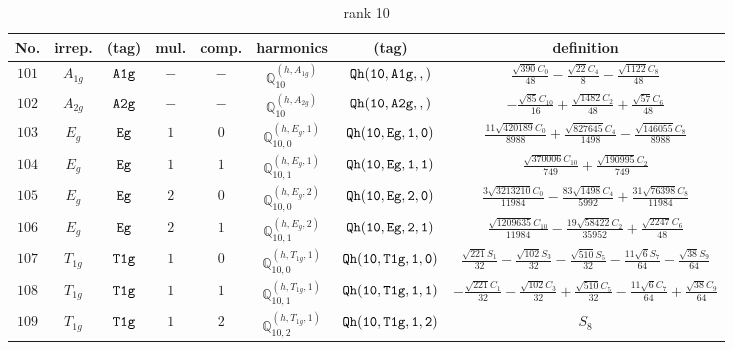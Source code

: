 \documentclass[fleqn,8pt]{jsarticle}
\begin{document}
\begin{table}[ht!]
\begin{center}
\caption{rank 10}
\renewcommand{\arraystretch}{1.3}
\begin{tabular}{cccccccc} \hline \hline
No. & irrep. & (tag) & mul. & comp. & harmonics & (tag) & definition \\ \hline
$ 101 $ & $ A_{1g} $ & $ {\tt A1g} $ & $ - $ & $ - $ & $ \mathbb{Q}_{10}^{(h,A_{1g})} $ & $ {\tt Qh(10,A1g,,)} $ & $ \frac{\sqrt{390} C_{0}}{48} - \frac{\sqrt{22} C_{4}}{8} - \frac{\sqrt{1122} C_{8}}{48} $ \\
$ 102 $ & $ A_{2g} $ & $ {\tt A2g} $ & $ - $ & $ - $ & $ \mathbb{Q}_{10}^{(h,A_{2g})} $ & $ {\tt Qh(10,A2g,,)} $ & $ - \frac{\sqrt{85} C_{10}}{16} + \frac{\sqrt{1482} C_{2}}{48} + \frac{\sqrt{57} C_{6}}{48} $ \\
$ 103 $ & $ E_{g} $ & $ {\tt Eg} $ & $ 1 $ & $ 0 $ & $ \mathbb{Q}_{10,0}^{(h,E_{g},1)} $ & $ {\tt Qh(10,Eg,1,0)} $ & $ \frac{11 \sqrt{420189} C_{0}}{8988} + \frac{\sqrt{827645} C_{4}}{1498} - \frac{\sqrt{146055} C_{8}}{8988} $ \\
$ 104 $ & $ E_{g} $ & $ {\tt Eg} $ & $ 1 $ & $ 1 $ & $ \mathbb{Q}_{10,1}^{(h,E_{g},1)} $ & $ {\tt Qh(10,Eg,1,1)} $ & $ \frac{\sqrt{370006} C_{10}}{749} + \frac{\sqrt{190995} C_{2}}{749} $ \\
$ 105 $ & $ E_{g} $ & $ {\tt Eg} $ & $ 2 $ & $ 0 $ & $ \mathbb{Q}_{10,0}^{(h,E_{g},2)} $ & $ {\tt Qh(10,Eg,2,0)} $ & $ \frac{3 \sqrt{3213210} C_{0}}{11984} - \frac{83 \sqrt{1498} C_{4}}{5992} + \frac{31 \sqrt{76398} C_{8}}{11984} $ \\
$ 106 $ & $ E_{g} $ & $ {\tt Eg} $ & $ 2 $ & $ 1 $ & $ \mathbb{Q}_{10,1}^{(h,E_{g},2)} $ & $ {\tt Qh(10,Eg,2,1)} $ & $ \frac{\sqrt{1209635} C_{10}}{11984} - \frac{19 \sqrt{58422} C_{2}}{35952} + \frac{\sqrt{2247} C_{6}}{48} $ \\
$ 107 $ & $ T_{1g} $ & $ {\tt T1g} $ & $ 1 $ & $ 0 $ & $ \mathbb{Q}_{10,0}^{(h,T_{1g},1)} $ & $ {\tt Qh(10,T1g,1,0)} $ & $ \frac{\sqrt{221} S_{1}}{32} - \frac{\sqrt{102} S_{3}}{32} - \frac{\sqrt{510} S_{5}}{32} - \frac{11 \sqrt{6} S_{7}}{64} - \frac{\sqrt{38} S_{9}}{64} $ \\
$ 108 $ & $ T_{1g} $ & $ {\tt T1g} $ & $ 1 $ & $ 1 $ & $ \mathbb{Q}_{10,1}^{(h,T_{1g},1)} $ & $ {\tt Qh(10,T1g,1,1)} $ & $ - \frac{\sqrt{221} C_{1}}{32} - \frac{\sqrt{102} C_{3}}{32} + \frac{\sqrt{510} C_{5}}{32} - \frac{11 \sqrt{6} C_{7}}{64} + \frac{\sqrt{38} C_{9}}{64} $ \\
$ 109 $ & $ T_{1g} $ & $ {\tt T1g} $ & $ 1 $ & $ 2 $ & $ \mathbb{Q}_{10,2}^{(h,T_{1g},1)} $ & $ {\tt Qh(10,T1g,1,2)} $ & $ S_{8} $ \\

\end{tabular}
\end{center}
\end{table}
\end{document}
